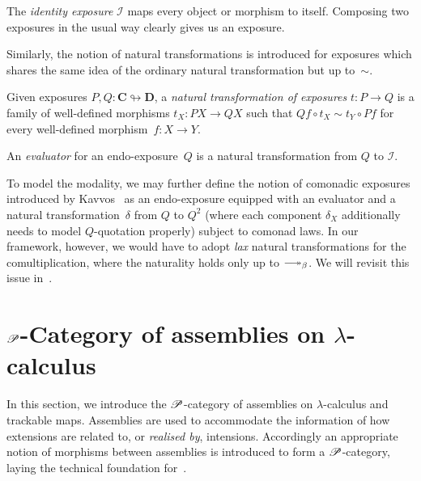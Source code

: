 \documentclass[a4paper,UKenglish,numberwithinsect,cleveref,thm-restate]{lipics-v2021}
\numberwithin{equation}{section}
\theoremstyle{plain}
\begin{document}
The \emph{identity exposure} $\mathcal{I}$ maps every object or morphism to itself.
Composing two exposures in the usual way clearly gives us an exposure. 

Similarly, the notion of natural transformations is introduced for exposures which shares the same idea of the ordinary natural transformation but up to~$\sim$.
\begin{definition}
  Given exposures $P, Q\colon \mathbf{C} \looparrowright \mathbf{D}$, a \emph{natural transformation of exposures} $t\colon P \to Q$ is a family of well-defined morphisms $t_X \colon PX \to QX$ such that $Qf \circ t_X \sim t_Y \circ Pf$ for every well-defined morphism~$f\colon X \to Y$. 
\end{definition}
An \emph{evaluator} for an endo-exposure~$Q$ is a natural transformation from $Q$ to $\mathcal{I}$.

To model the \SFour modality, we may further define the notion of comonadic exposures introduced by Kavvos~\cite{Kavvos2017b} as an endo-exposure equipped with an evaluator and a natural transformation~$\delta$ from $Q$ to $Q^2$ (where each component $\delta_X$ additionally needs to model $Q$-quotation properly) subject to comonad laws.
In our framework, however, we would have to adopt \emph{lax} natural transformations for the comultiplication, where the naturality holds only up to $\reduce$.
We will revisit this issue in~.

\section{\texorpdfstring{$\mathscr{P}$}{P}-Category of assemblies on \texorpdfstring{$\lambda$}{λ}-calculus}\label{sec:assemblies}

In this section, we introduce the $\mathscr{P}$-category of assemblies on $\lambda$-calculus and trackable maps.
Assemblies are used to accommodate the information of how extensions are related to, or \emph{realised by}, intensions. Accordingly an appropriate notion of morphisms between assemblies is introduced to form a $\mathscr{P}$-category, laying
the technical foundation for~.
\end{document}
